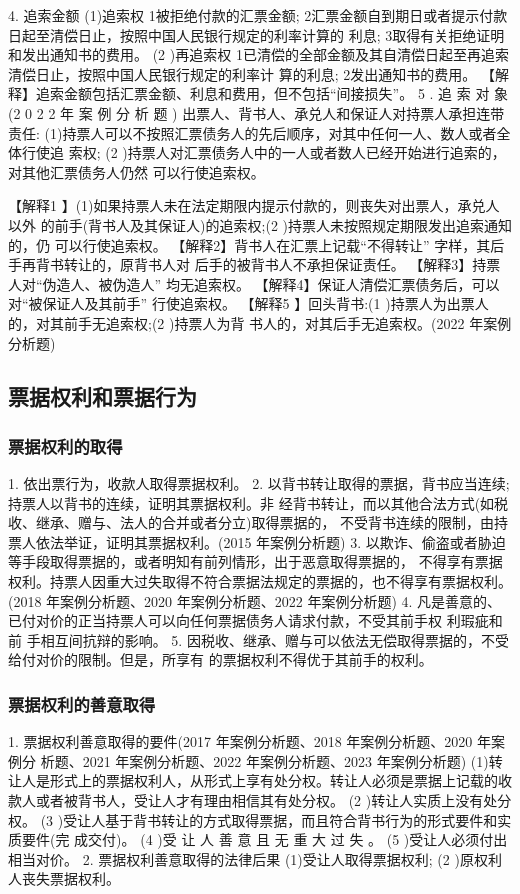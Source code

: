 \documentclass[UTF8,12pt]{ctexart}
\numberwithin{equation}{section} %
\numberwithin{figure}{section}
\numberwithin{table}{section}
\begin{document}
	4. 追索金额
	(1)追索权
	1被拒绝付款的汇票金额; 2汇票金额自到期日或者提示付款日起至清偿日止，按照中国人民银行规定的利率计算的 利息;
	3取得有关拒绝证明和发出通知书的费用。
	(2 )再追索权 1已清偿的全部金额及其自清偿日起至再追索清偿日止，按照中国人民银行规定的利率计 算的利息;
	2发出通知书的费用。 【解释】追索金额包括汇票金额、利息和费用，但不包括“间接损失”。
	5 . 追 索 对 象 (2 0 2 2 年 案 例 分 析 题 ) 出票人、背书人、承兑人和保证人对持票人承担连带责任: (1)持票人可以不按照汇票债务人的先后顺序，对其中任何一人、数人或者全体行使追 索权;
	(2 )持票人对汇票债务人中的一人或者数人已经开始进行追索的，对其他汇票债务人仍然 可以行使追索权。
	
	【解释1 】(1)如果持票人未在法定期限内提示付款的，则丧失对出票人，承兑人以外 的前手(背书人及其保证人)的追索权;(2 )持票人未按照规定期限发出追索通知的，仍 可以行使追索权。
	【解释2】背书人在汇票上记载“不得转让” 字样，其后手再背书转让的，原背书人对 后手的被背书人不承担保证责任。
	【解释3】持票人对“伪造人、被伪造人” 均无追索权。 【解释4】保证人清偿汇票债务后，可以对“被保证人及其前手” 行使追索权。 【解释5 】回头背书:(1 )持票人为出票人的，对其前手无追索权;(2 )持票人为背 书人的，对其后手无追索权。(2022 年案例分析题)
	
	\subsection{票据权利和票据行为}
	
	\subsubsection{票据权利的取得}
	1. 依出票行为，收款人取得票据权利。
	2. 以背书转让取得的票据，背书应当连续;持票人以背书的连续，证明其票据权利。非 经背书转让，而以其他合法方式(如税收、继承、赠与、法人的合并或者分立)取得票据的， 不受背书连续的限制，由持票人依法举证，证明其票据权利。(2015 年案例分析题)
	3. 以欺诈、偷盗或者胁迫等手段取得票据的，或者明知有前列情形，出于恶意取得票据的， 不得享有票据权利。持票人因重大过失取得不符合票据法规定的票据的，也不得享有票据权利。 (2018 年案例分析题、2020 年案例分析题、2022 年案例分析题)
	4. 凡是善意的、已付对价的正当持票人可以向任何票据债务人请求付款，不受其前手权 利瑕疵和前 手相互间抗辩的影响。
	5. 因税收、继承、赠与可以依法无偿取得票据的，不受给付对价的限制。但是，所享有 的票据权利不得优于其前手的权利。
	 
	\subsubsection{票据权利的善意取得} 
	1. 票据权利善意取得的要件(2017 年案例分析题、2018 年案例分析题、2020 年案例分 析题、2021 年案例分析题、2022 年案例分析题、2023 年案例分析题) (1)转让人是形式上的票据权利人，从形式上享有处分权。转让人必须是票据上记载的收 款人或者被背书人，受让人才有理由相信其有处分权。
	(2 )转让人实质上没有处分权。
	(3 )受让人基于背书转让的方式取得票据，而且符合背书行为的形式要件和实质要件(完 成交付)。
	(4 )受 让 人 善 意 且 无 重 大 过 失 。
	(5 )受让人必须付出相当对价。
	2. 票据权利善意取得的法律后果
	(1)受让人取得票据权利;
	(2 )原权利人丧失票据权利。
	
\end{document}
